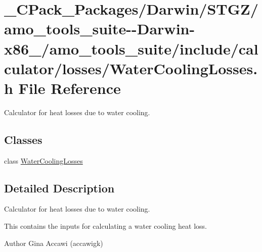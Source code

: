 \hypertarget{___c_pack___packages_2_darwin_2_s_t_g_z_2amo__tools__suite--_darwin-x86__64_2amo__tools__suite_2648016b82c2503c0c1f23360ff1dd754}{}\section{\+\_\+\+C\+Pack\+\_\+\+Packages/\+Darwin/\+S\+T\+G\+Z/amo\+\_\+tools\+\_\+suite-\/-\/\+Darwin-\/x86\+\_/amo\+\_\+tools\+\_\+suite/include/calculator/losses/\+Water\+Cooling\+Losses.h File Reference}
\label{___c_pack___packages_2_darwin_2_s_t_g_z_2amo__tools__suite--_darwin-x86__64_2amo__tools__suite_2648016b82c2503c0c1f23360ff1dd754}


Calculator for heat losses due to water cooling.  


\subsection*{Classes}
\begin{DoxyCompactItemize}
\item 
class \hyperlink{class_water_cooling_losses}{Water\+Cooling\+Losses}
\end{DoxyCompactItemize}


\subsection{Detailed Description}
Calculator for heat losses due to water cooling. 

This contains the inputs for calculating a water cooling heat loss.

\begin{DoxyAuthor}{Author}
Gina Accawi (accawigk) 
\end{DoxyAuthor}
